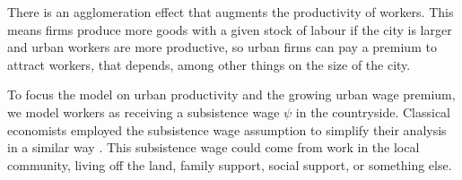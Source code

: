 There is an agglomeration effect that augments the productivity of workers. This means firms produce more goods with a given stock of labour if the city is larger and urban workers are more productive, %
so urban firms can pay a premium to attract workers, that depends, among other things on the size of the city. %


To focus the model on urban productivity and the growing urban wage premium, we model workers as receiving a \gls{subsistence wage} $\psi$ in the countryside. Classical economists employed the \gls{subsistence wage} assumption to simplify their analysis in a similar way \cite{GET_classical-subsistence-wage}. This subsistence wage could come from work in the local community, living off the land, family support, social support, or something else. 

